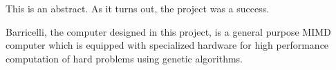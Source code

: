 This is an abstract.
As it turns out, the project was a success.

Barricelli, the computer designed in this project, is a general purpose MIMD computer which is equipped with specialized hardware for high performance computation of hard problems using genetic algorithms.


